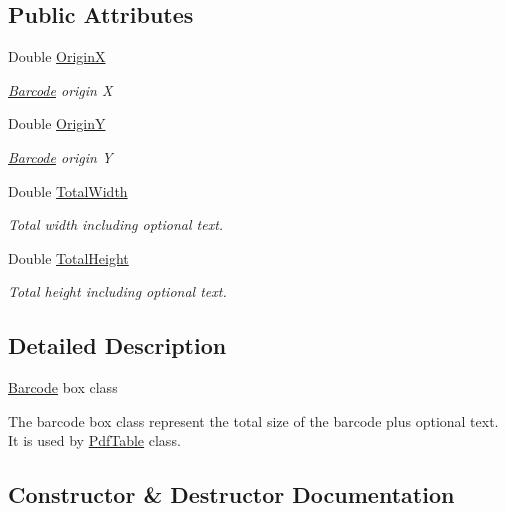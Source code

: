 \subsection*{Public Attributes}
\begin{DoxyCompactItemize}
\item 
Double \hyperlink{class_pdf_file_writer_1_1_barcode_box_a3ef40dad200f4561a241e653b5c8b9e6}{OriginX}
\begin{DoxyCompactList}\small\item\em \hyperlink{class_pdf_file_writer_1_1_barcode}{Barcode} origin X \end{DoxyCompactList}\item 
Double \hyperlink{class_pdf_file_writer_1_1_barcode_box_abc7dc3398cb547f7f6bf7890d9231b90}{OriginY}
\begin{DoxyCompactList}\small\item\em \hyperlink{class_pdf_file_writer_1_1_barcode}{Barcode} origin Y \end{DoxyCompactList}\item 
Double \hyperlink{class_pdf_file_writer_1_1_barcode_box_a6cb4866d8c0b17c7ddfdedd297574def}{Total\+Width}
\begin{DoxyCompactList}\small\item\em Total width including optional text. \end{DoxyCompactList}\item 
Double \hyperlink{class_pdf_file_writer_1_1_barcode_box_ab28ba49a22e136caf4373eeed103f98c}{Total\+Height}
\begin{DoxyCompactList}\small\item\em Total height including optional text. \end{DoxyCompactList}\end{DoxyCompactItemize}


\subsection{Detailed Description}
\hyperlink{class_pdf_file_writer_1_1_barcode}{Barcode} box class 

The barcode box class represent the total size of the barcode plus optional text. It is used by \hyperlink{class_pdf_file_writer_1_1_pdf_table}{Pdf\+Table} class. 

\subsection{Constructor \& Destructor Documentation}
